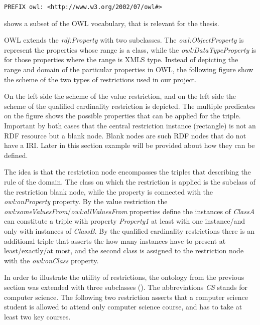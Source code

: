 \begin{lstlisting}[basicstyle=\footnotesize, captionpos=b, caption=OWL namespace, label=lst:sparql, belowskip=1em, aboveskip=2em,
frame=single]
PREFIX owl: <http://www.w3.org/2002/07/owl#>
\end{lstlisting}


 shows a subset of the OWL vocabulary, that is relevant for the thesis.



OWL extends the \textit{rdf:Property} with two subclasses. The \textit{owl:ObjectProperty} is represent the properties whose range is a class, while the \textit{owl:DataTypeProperty} is for those properties where the range is XMLS type. Instead of depicting the range and domain of the particular properties in OWL, the following figure show the scheme of the two types of restrictions used in our project.


On the left side the scheme of the value restriction, and on the left side the scheme of the qualified cardinality restriction is depicted. The multiple predicates on the figure shows the possible properties that can be applied for the triple. Important by both cases that the central restriction instance (rectangle) is not an RDF resource but a blank node. Blank nodes are such RDF nodes that do not have a IRI. Later in this section example will be provided about how they can be defined. 

The idea is that the restriction node encompasses the triples that describing the rule of the domain. The class on which the restriction is applied is the subclass of the restriction blank node, while the property is connected with the \textit{owl:onProperty} property. By the value restriction the \textit{owl:someValuesFrom}/\textit{owl:allValuesFrom} properties define the instances of \textit{ClassA} can constitute a triple with property \textit{Property1} at least with one instance/and only with instances of \textit{ClassB}. By the qualified cardinality restrictions there is an additional triple that asserts the how many instances have to present at least/exactly/at most, and the second class is assigned to the restriction node with the \textit{owl:onClass} property.



In order to illustrate the utility of restrictions, the ontology from the previous section was extended with three subclasses (). The abbreviations \textit{CS} stands for computer science. The following two restriction asserts that a computer science student is allowed to attend only computer science course, and has to take at least two key courses.


